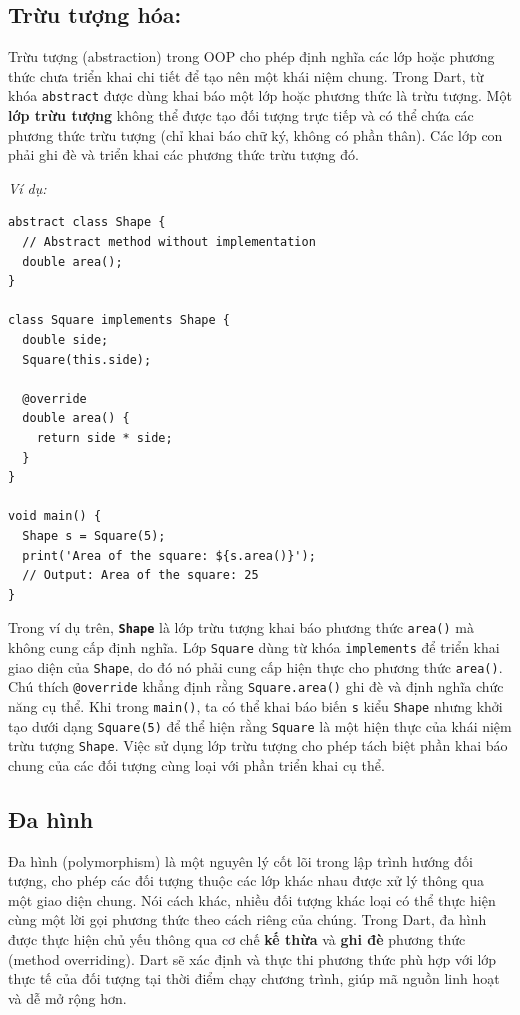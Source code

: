 \documentclass[../DoAn.tex]{subfiles}
\numberwithin{figure}{chapter}
\begin{document}
\subsection{Trừu tượng hóa:} 
Trừu tượng (abstraction) trong OOP cho phép định nghĩa các lớp hoặc phương thức chưa triển khai chi tiết để tạo nên một khái niệm chung. Trong Dart, từ khóa \texttt{abstract} được dùng khai báo một lớp hoặc phương thức là trừu tượng. Một \textbf{lớp trừu tượng} không thể được tạo đối tượng trực tiếp và có thể chứa các phương thức trừu tượng (chỉ khai báo chữ ký, không có phần thân). Các lớp con phải ghi đè và triển khai các phương thức trừu tượng đó. 

\textit{Ví dụ:}
\begin{lstlisting}
abstract class Shape {
  // Abstract method without implementation
  double area();
}

class Square implements Shape {
  double side;
  Square(this.side);

  @override
  double area() {
    return side * side;
  }
}

void main() {
  Shape s = Square(5);
  print('Area of the square: ${s.area()}');
  // Output: Area of the square: 25
}
\end{lstlisting}

Trong ví dụ trên, \textbf{\texttt{Shape}} là lớp trừu tượng khai báo phương thức \texttt{area()} mà không cung cấp định nghĩa. Lớp \texttt{Square} dùng từ khóa \texttt{implements} để triển khai giao diện của \texttt{Shape}, do đó nó phải cung cấp hiện thực cho phương thức \texttt{area()}. Chú thích \texttt{@override} khẳng định rằng \texttt{Square.area()} ghi đè và định nghĩa chức năng cụ thể. Khi trong \texttt{main()}, ta có thể khai báo biến \texttt{s} kiểu \texttt{Shape} nhưng khởi tạo dưới dạng \texttt{Square(5)} để thể hiện rằng \texttt{Square} là một hiện thực của khái niệm trừu tượng \texttt{Shape}. Việc sử dụng lớp trừu tượng cho phép tách biệt phần khai báo chung của các đối tượng cùng loại với phần triển khai cụ thể.

\subsection{Đa hình} 
Đa hình (polymorphism) là một nguyên lý cốt lõi trong lập trình hướng đối tượng, cho phép các đối tượng thuộc các lớp khác nhau được xử lý thông qua một giao diện chung. Nói cách khác, nhiều đối tượng khác loại có thể thực hiện cùng một lời gọi phương thức theo cách riêng của chúng. Trong Dart, đa hình được thực hiện chủ yếu thông qua cơ chế \textbf{kế thừa} và \textbf{ghi đè} phương thức (method overriding). Dart sẽ xác định và thực thi phương thức phù hợp với lớp thực tế của đối tượng tại thời điểm chạy chương trình, giúp mã nguồn linh hoạt và dễ mở rộng hơn.
\end{document}
